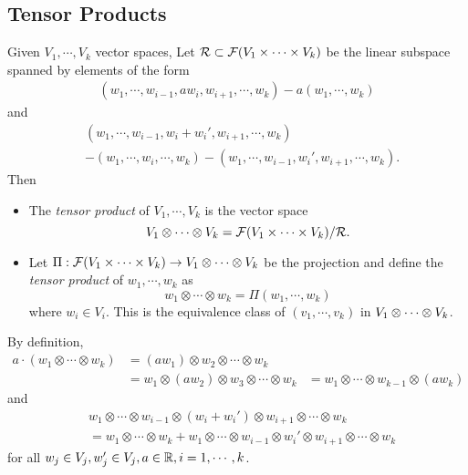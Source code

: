 \subsection{Tensor Products}
Given $V_1, \cdots, V_k$ vector spaces, Let $\mathcal{R} \subset \mathcal{F}(V_1 \times \cdots \times V_k)$ be the linear subspace spanned by elements of the form 
    \begin{align*}
    (w_1, \cdots, w_{i-1}, aw_i, w_{i+1}, \cdots, w_k) - a(w_1, \cdots, w_k)
    \end{align*} and 
    \begin{align*}
    &(w_1, \cdots, w_{i-1}, w_i + w_i', w_{i+1}, \cdots, w_k) \\
    &- (w_1, \cdots, w_i, \cdots, w_k) - (w_1, \cdots, w_{i-1}, w_i', w_{i+1}, \cdots, w_k).  
    \end{align*}
Then
\begin{itemize} 
    \item The \textit{tensor product} of $V_1, \cdots, V_k$ is the vector space 
    $$V_1 \otimes \cdots \otimes V_k = \mathcal{F}(V_1 \times \cdots \times V_k) / \mathcal{R}. $$
    \item Let $\Pi:\mathcal{F}(V_1 \times \cdots \times V_k) \to V_1 \otimes \cdots \otimes V_k$ be the projection and define the \textit{tensor product} of $w_1, \cdots, w_k$ as
    $$w_1 \otimes \cdots \otimes w_k = \Pi(w_1, \cdots, w_k)$$ where $w_i \in V_i$. This is the equivalence class of $(v_1, \cdots, v_k)$ in $V_1 \otimes \cdots \otimes V_k$. 
\end{itemize}
\begin{remark}
    By definition, 
    \begin{align*}
    a \cdot (w_1 \otimes \cdots \otimes w_k) 
    &= (aw_1) \otimes w_2 \otimes \cdots \otimes w_k \\
    &= w_1 \otimes (aw_2) \otimes w_3 \otimes \cdots \otimes w_k
    &= w_1 \otimes \cdots \otimes w_{k-1} \otimes (aw_k)
    \end{align*} and 
    \begin{align*}
    &w_1 \otimes \cdots \otimes w_{i-1} \otimes (w_i + w_i') \otimes w_{i+1} \otimes \cdots \otimes w_k \\
    &= w_1 \otimes \cdots \otimes w_k + w_1 \otimes \cdots \otimes w_{i-1} \otimes w_i' \otimes w_{i+1} \otimes \cdots \otimes w_k
    \end{align*}
    for all $w_j \in V_j, w_j' \in V_j, a \in \mathbb{R}, i=1,\cdots, k$.
\end{remark}


